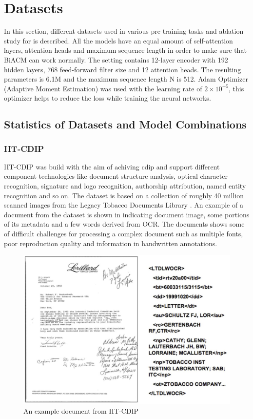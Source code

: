 \chapter{Datasets\label{datasets}}
In this section, different datasets used in various pre-training tasks and ablation study for \cite{wang-etal-2022-lilt} is described. All the models have an equal amount of self-attention layers, attention heads and maximum sequence length in order to make sure that BiACM can work normally. The   setting contains 12-layer encoder with 192 hidden layers, 768 feed-forward filter size and 12 attention heads. The resulting parameters is 6.1M and the maximum sequence length N is 512. Adam Optimizer (Adaptive Moment Estimation) \cite{loshchilov2017decoupled} was used with the learning rate of $2\times10^{-5}$, this optimizer helps to reduce the loss while training the neural networks.


\section{Statistics of Datasets and Model Combinations}
\subsection{IIT-CDIP}
IIT-CDIP \cite{lewis2006building} was build with the aim of achiving \acrfull{cdip} and support different component technologies like document structure analysis, optical character recognition, signature and logo recognition, authorship attribution, named entity recognition and so on. The dataset is based on a collection of roughly 40 million scanned images from the Legacy Tobacco Documents Library \cite{schmidt2002building}. An example of a document from the dataset is shown in  indicating document image, some portions of its metadata and a few words derived from OCR. The documents shows some of difficult challenges for processing a complex document such as multiple fonts, poor reproduction quality and information in handwritten annotations.  

\begin{figure}[ht]
    \centering
    \includegraphics[width=0.7 \textwidth]{chapters/images/Methods/Datasets/IIT-CDIP.JPG}
    \caption{An example document from IIT-CDIP \cite{lewis2006building}}
    \label{fig:IIT-CDIP}
\end{figure}


